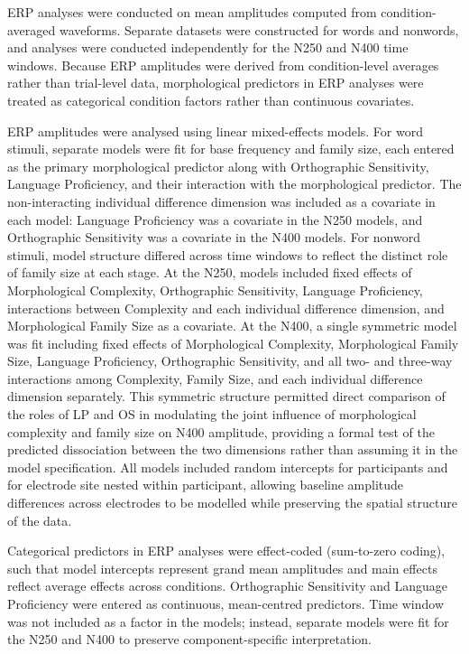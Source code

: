 \documentclass[utf8]{FrontiersinHarvard} %
\begin{document}
	ERP analyses were conducted on mean amplitudes computed from condition-averaged waveforms. Separate datasets were constructed for words and nonwords, and analyses were conducted independently for the N250 and N400 time windows. Because ERP amplitudes were derived from condition-level averages rather than trial-level data, morphological predictors in ERP analyses were treated as categorical condition factors rather than continuous covariates.
	
	ERP amplitudes were analysed using linear mixed-effects models. For word stimuli, separate models were fit for base frequency and family size, each entered as the primary morphological predictor along with Orthographic Sensitivity, Language Proficiency, and their interaction with the morphological predictor. The non-interacting individual difference dimension was included as a covariate in each model: Language Proficiency was a covariate in the N250 models, and Orthographic Sensitivity was a covariate in the N400 models. For nonword stimuli, model structure differed across time windows to reflect the distinct role of family size at each stage. At the N250, models included fixed effects of Morphological Complexity, Orthographic Sensitivity, Language Proficiency, interactions between Complexity and each individual difference dimension, and Morphological Family Size as a covariate. At the N400, a single symmetric model was fit including fixed effects of Morphological Complexity, Morphological Family Size, Language Proficiency, Orthographic Sensitivity, and all two- and three-way interactions among Complexity, Family Size, and each individual difference dimension separately. This symmetric structure permitted direct comparison of the roles of LP and OS in modulating the joint influence of morphological complexity and family size on N400 amplitude, providing a formal test of the predicted dissociation between the two dimensions rather than assuming it in the model specification. All models included random intercepts for participants and for electrode site nested within participant, allowing baseline amplitude differences across electrodes to be modelled while preserving the spatial structure of the data.
	
	Categorical predictors in ERP analyses were effect-coded (sum-to-zero coding), such that model intercepts represent grand mean amplitudes and main effects reflect average effects across conditions. Orthographic Sensitivity and Language Proficiency were entered as continuous, mean-centred predictors. Time window was not included as a factor in the models; instead, separate models were fit for the N250 and N400 to preserve component-specific interpretation.
	
\end{document}
